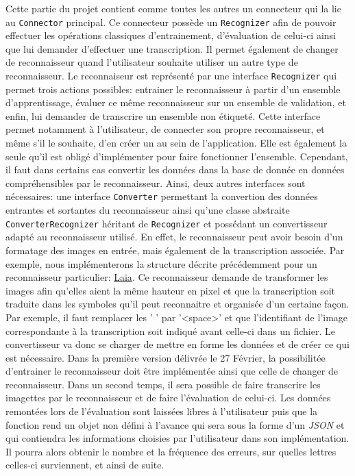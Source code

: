 Cette partie du projet contient comme toutes les autres un connecteur qui la lie au \texttt{Connector} principal. Ce connecteur possède un \texttt{Recognizer} afin de pouvoir effectuer les opérations classiques d'entrainement, d'évaluation de celui-ci ainsi que lui demander d'effectuer une transcription. Il permet également de changer de reconnaisseur quand l'utilisateur souhaite utiliser un autre type de reconnaisseur.
\newline{}
Le reconnaiseur est représenté par une interface \texttt{Recognizer} qui permet trois actions possibles: entrainer le reconnaisseur à partir d'un ensemble d'apprentissage, évaluer ce même reconnaisseur sur un ensemble de validation, et enfin, lui demander de transcrire un ensemble non étiqueté.
Cette interface permet notamment à l'utilisateur, de connecter son propre reconnaisseur, et même s'il le souhaite, d'en créer un au sein de l'application. Elle est également la seule qu'il est obligé d'implémenter pour faire fonctionner l'ensemble. Cependant, il faut dans certains cas convertir les données dans la base de donnée en données compréhensibles par le reconnaisseur. Ainsi, deux autres interfaces sont nécessaires: une interface \texttt{Converter} permettant la convertion des données entrantes et sortantes du reconnaisseur ainsi qu'une classe abstraite \texttt{ConverterRecognizer} héritant de \texttt{Recognizer} et possédant un convertisseur adapté au reconnaisseur utilisé. En effet, le reconnaisseur peut avoir besoin d'un formatage des images en entrée, mais également de la transcription associée. Par exemple, nous implémenterons la structure décrite précédemment pour un reconnaisseur particulier: \href{https://github.com/jpuigcerver/Laia}{Laia}. Ce reconnaisseur demande de transformer les images afin qu'elles aient la même hauteur en pixel et que la transcription soit traduite dans les symboles qu'il peut reconnaitre et organisée d'un certaine façon. Par exemple, il faut remplacer les  ' ' par '<space>' et que l'identifiant de l'image correspondante à la transcription soit indiqué avant celle-ci dans un fichier. Le convertisseur va donc se charger de mettre en forme les données et de créer ce qui est nécessaire.
\newline{}
Dans la première version délivrée le 27 Février, la possibilitée d'entrainer le reconnaisseur doit être implémentée ainsi que celle de changer de reconnaisseur. Dans un second temps, il sera possible de faire transcrire les imagettes par le reconnaisseur et de faire l'évaluation de celui-ci. Les données remontées lors de l'évaluation sont laissées libres à l'utilisateur puis que la fonction rend un objet non défini à l'avance qui sera sous la forme d'un \textit{JSON} et qui contiendra les informations choisies par l'utilisateur dans son implémentation. Il pourra alors obtenir le nombre et la fréquence des erreurs, sur quelles lettres celles-ci surviennent, et ainsi de suite.

